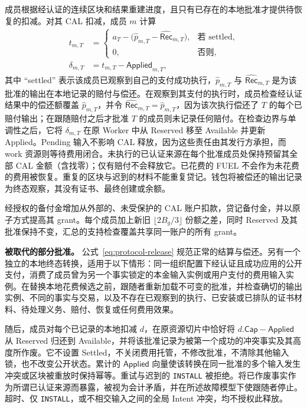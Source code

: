 成员根据经认证的连续区块和结果重建进度，且只有已存在的本地批准才提供待恢复的扣减。对其 CAL 扣减，成员 $m$ 计算
\begin{equation}
  \begin{aligned}
    t_{m,T}&=
    \begin{cases}
      a_T-\bigl(\widehat{p}_{m,T}-\widehat{\mathsf{Rec}}_{m,T}\bigr),
        &\text{若 settled},\\
      0,&\text{否则},
    \end{cases}\\
    \delta_{m,T}&=t_{m,T}-\mathsf{Applied}_{m,T},
  \end{aligned}
  \label{eq:protocol-release}
\end{equation}
其中 ``settled'' 表示该成员已观察到自己的支付成功执行，$\widehat{p}_{m,T}$ 与 $\widehat{\mathsf{Rec}}_{m,T}$ 是为该批准的输出在本地记录的赔付与偿还。在观察到其支付的执行时，成员检查经认证结果中的偿还额覆盖 $\widehat{p}_{m,T}$，并令 $\widehat{\mathsf{Rec}}_{m,T}=\widehat{p}_{m,T}$，因为该次执行偿还了 $T$ 的每个已赔付输出；在跟随赔付之后才批准 $T$ 的成员则未记录任何赔付。在检查边界与单调性之后，它将 $\delta_{m,T}$ 在原 Worker 中从 Reserved 移至 Available 并更新 Applied。Pending 输入不影响 CAL 释放，因为这些责任由其发行方承担，而 work 资源则等待费用闭合。未执行的已认证来源在每个批准成员处保持预留其全部 CAL 金额（含找零）；仅有赔付不会释放它。已花费的 FUEL 不会作为未花费的费用被恢复。重复的区块与迟到的材料不能重复贷记。钱包将被偿还的输出记录为终态观察，其没有证书、最终创建或余额。

经授权的备付金增加从外部的、未受保护的 CAL 账户扣款，贷记备付金，并以原子方式提高其 grant。每个成员加上新旧 $\lfloor2B_g/3\rfloor$ 份额之差，同时 Reserved 及其批准保持不变，汇总的支持检查覆盖共享同一账户的所有 grant。

\noindent\textbf{被取代的部分批准。}
公式~\eqref{eq:protocol-release} 规范正常的结算与偿还。另有一个独立的本地终态转换，适用于以下情形：同一组织配置下经认证且成功应用的公开支付，消费了成员曾为另一个事实锁定的本金输入实例或用户支付的费用输入实例。在替换本地花费候选之前，跟随者重新加载不可变的批准，并检查确切的输出实例、不同的事实与交易，以及不存在已观察到的执行、已安装或已排队的证书材料、待处理义务、赔付、恢复或任何费用效果。

随后，成员对每个已记录的本地扣减 $d$，在原资源切片中恰好将 $d.\mathsf{Cap}-\mathsf{Applied}$ 从 Reserved 归还到 Available，并将该批准记录为被第一个成功的冲突事实及其高度所作废。它不设置 \textsf{Settled}，不关闭费用托管，不修改批准，不清除其他输入锁，也不改变公开状态。累计的 $\mathsf{Applied}$ 向量使该转换在同一批准的多个输入发生冲突或区块被重放时保持幂等。重试与迟到的 \texttt{INSTALL} 被拒绝。将已作废事实作为所谓已认证来源而暴露，被视为会计矛盾，并在所述故障模型下使跟随者停止。超时、仅 \texttt{INSTALL}，或不相交输入之间的全局 Intent 冲突，均不授权此释放。

